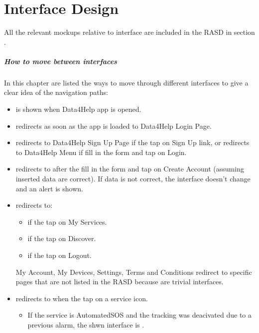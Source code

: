 \documentclass[../DD.tex]{subfiles}
\begin{document}
 \chapter{ Interface Design}
	All the relevant mockups relative to  interface are included in the RASD in section .
	\paragraph{How to move between interfaces}
	In this chapter are listed the ways to move through different interfaces to give a clear idea of the navigation paths:
	\begin{itemize}
		\item{ is shown when Data4Help app is opened.}
		\item{ redirects as soon as the app is loaded to Data4Help Login Page.}
		\item{ redirects to Data4Help Sign Up Page if the  tap on Sign Up link, or redirects to Data4Help Menu if  fill in the form and tap on Login.}
		\item{ redirects to  after the  fill in the form and tap on Create Account (assuming inserted data are correct). If data is not correct, the interface doesn't change and an alert is shown.}
		\item{ redirects to:}
			\begin{itemize}
				\item{ if the  tap on My Services.}
				\item{ if the  tap on Discover.}
				\item{ if the  tap on Logout.}				
			\end{itemize}
			My Account, My Devices, Settings, Terms and Conditions redirect to specific pages that are not listed in the RASD because are trivial interfaces. 
		\item{ redirects to  when the  tap on a service icon.}
			\begin{itemize}
				\item{If the service is AutomatedSOS and the tracking was deacivated due to a previous alarm, the shwn interface is .}
			\end{itemize}

\end{itemize}
\end{document}
